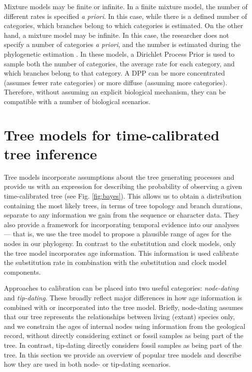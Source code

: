 \documentclass[11pt]{article}
\begin{document}
Mixture models may be finite or infinite.
In a finite mixture model, the number of different rates is specified \textit{a priori}. 
In this case, while there is a defined number of categories, which branches belong to which categories is estimated.
On the other hand, a mixture model may be infinite.
In this case, the researcher does not specify a number of categories \textit{a priori}, and the number is estimated during the phylogenetic estimation \cite{Heath2012a}.
In these models, a Dirichlet Process Prior is used to sample both the number of categories, the average rate for each category, and which branches belong to that category.
A DPP can be more concentrated (assumes fewer rate categories) or more diffuse (assuming more categories).
Therefore, without assuming an explicit biological mechanism, they can be compatible with a number of biological scenarios. 

\section{Tree models for time-calibrated tree inference}


Tree models incorporate assumptions about the tree generating processes and provide us with an expression for describing the probability of observing a given time-calibrated tree (see Fig. \ref{fig:bayes}). This allows us to obtain a distribution containing the most likely trees, in terms of tree topology and branch durations, separate to any information we gain from the sequence or character data.
They also provide a framework for incorporating temporal evidence into our analyses --- that is, we use the tree model to propose a plausible range of ages for the nodes in our phylogeny.
In contrast to the substitution and clock models, only the tree model incorporates age information. %
This information is used calibrate the substitution rate in combination with the substitution and clock model components.

Approaches to calibration can be placed into two useful categories: \textit{node-dating} and \textit{tip-dating}. 
These broadly reflect major differences in how age information is combined with or incorporated into the tree model.
Briefly, node-dating assumes that our tree represents the relationships between living (extant) species only, and we constrain the ages of internal nodes using information from the geological record, without directly considering extinct or fossil samples as being part of the tree.
In contrast, tip-dating directly considers fossil samples as being part of the tree.
In this section we provide an overview of popular tree models and describe how they are used in both node- or tip-dating scenarios.
\end{document}
